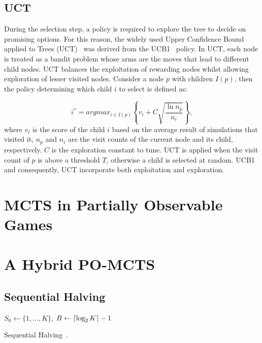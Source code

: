 \documentclass[a4paper]{llncs}
\DeclarePairedDelimiter{\ceil}{\lceil}{\rceil}
\DeclarePairedDelimiter{\floor}{\lfloor}{\rfloor}
\begin{document}
\subsection{UCT}
\label{subsec:uct}
During the selection step, a policy is required to explore the tree to decide on promising options. For this reason, the widely used Upper Confidence Bound applied to Trees (UCT)~\cite{kocsis2006bandit} was derived from the UCB1~\cite{auer2002using} policy. In UCT, each node is treated as a bandit problem whose arms are the moves that lead to different child nodes. UCT balances the exploitation of rewarding nodes whilst allowing exploration of lesser visited nodes. Consider a node $p$ with children $I(p)$, then the policy determining which child $i$ to select is defined as:

\begin{equation}
\label{eq:uct}
i^* = argmax_{i \in I(p)}\left\{ v_i + C \sqrt{ \frac{\ln{n_p}}{n_i}}\right\},
\end{equation}
where $v_i$ is the score of the child $i$ based on the average result of simulations that visited it, $n_p$ and $n_i$ are the visit counts of the current node and its child, respectively. $C$ is the exploration constant to tune. UCT is applied when the visit count of $p$ is above a threshold $T$, otherwise a child is selected at random. UCB1 and consequently, UCT incorporate both exploitation and exploration.

\section{MCTS in Partially Observable Games}
\label{subsec:mcts-po-games}

\section{A Hybrid PO-MCTS}
\label{sec:h-mcts}

\subsection{Sequential Halving}
\label{subsec:seq_halving}

\IncMargin{1em}
\begin{algorithm2e}[t]
	\vspace{0.05cm}
	$S_0 \gets \{1,\dots,K\}$,
	$B \gets \ceil{\log_2{K}} - 1$														\;
	\BlankLine
  \caption[Sequential Halving]{Sequential Halving~\protect\cite{Karnin13SH}. \label{alg:seqhalv}}
\end{algorithm2e}
\DecMargin{1em}
\end{document}
